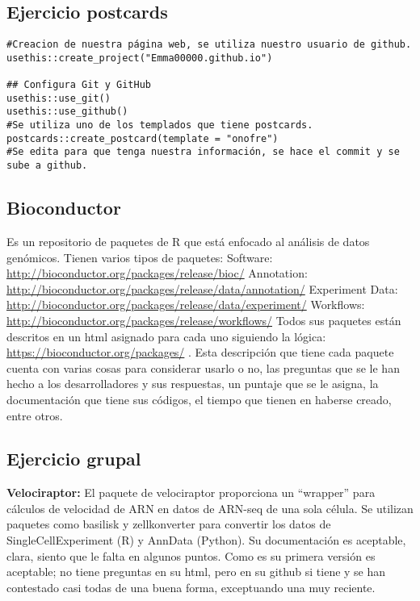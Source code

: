 \documentclass[
]{article}
\begin{document}
\hypertarget{ejercicio-postcards}{%
\subsection{Ejercicio postcards}\label{ejercicio-postcards}}

\begin{verbatim}
#Creacion de nuestra página web, se utiliza nuestro usuario de github.
usethis::create_project("Emma00000.github.io")

## Configura Git y GitHub
usethis::use_git()
usethis::use_github()
#Se utiliza uno de los templados que tiene postcards.
postcards::create_postcard(template = "onofre")
#Se edita para que tenga nuestra información, se hace el commit y se sube a github.
\end{verbatim}

\hypertarget{bioconductor}{%
\subsection{Bioconductor}\label{bioconductor}}

Es un repositorio de paquetes de R que está enfocado al análisis de
datos genómicos. Tienen varios tipos de paquetes: Software:
\url{http://bioconductor.org/packages/release/bioc/} Annotation:
\url{http://bioconductor.org/packages/release/data/annotation/}
Experiment Data:
\url{http://bioconductor.org/packages/release/data/experiment/}
Workflows: \url{http://bioconductor.org/packages/release/workflows/}
Todos sus paquetes están descritos en un html asignado para cada uno
siguiendo la lógica: \url{https://bioconductor.org/packages/} . Esta
descripción que tiene cada paquete cuenta con varias cosas para
considerar usarlo o no, las preguntas que se le han hecho a los
desarrolladores y sus respuestas, un puntaje que se le asigna, la
documentación que tiene sus códigos, el tiempo que tienen en haberse
creado, entre otros.

\hypertarget{ejercicio-grupal}{%
\subsection{Ejercicio grupal}\label{ejercicio-grupal}}

\textbf{Velociraptor:} El paquete de velociraptor proporciona un
``wrapper'' para cálculos de velocidad de ARN en datos de ARN-seq de una
sola célula. Se utilizan paquetes como basilisk y zellkonverter para
convertir los datos de SingleCellExperiment (R) y AnnData (Python). Su
documentación es aceptable, clara, siento que le falta en algunos
puntos. Como es su primera versión es aceptable; no tiene preguntas en
su html, pero en su github si tiene y se han contestado casi todas de
una buena forma, exceptuando una muy reciente.
\end{document}
